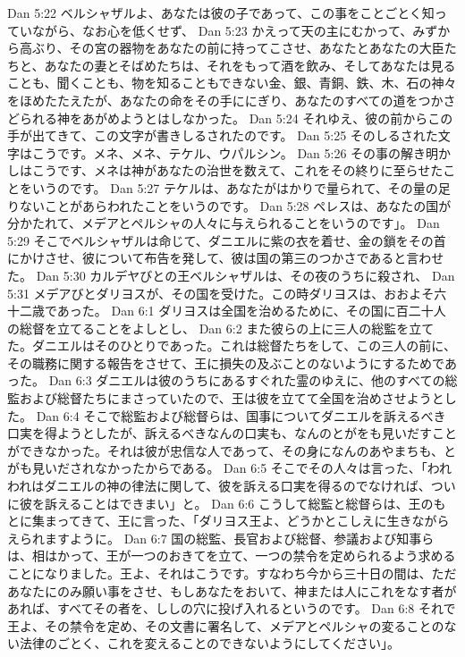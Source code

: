Dan 5:22  ベルシャザルよ、あなたは彼の子であって、この事をことごとく知っていながら、なお心を低くせず、
Dan 5:23  かえって天の主にむかって、みずから高ぶり、その宮の器物をあなたの前に持ってこさせ、あなたとあなたの大臣たちと、あなたの妻とそばめたちは、それをもって酒を飲み、そしてあなたは見ることも、聞くことも、物を知ることもできない金、銀、青銅、鉄、木、石の神々をほめたたえたが、あなたの命をその手ににぎり、あなたのすべての道をつかさどられる神をあがめようとはしなかった。
Dan 5:24  それゆえ、彼の前からこの手が出てきて、この文字が書きしるされたのです。
Dan 5:25  そのしるされた文字はこうです。メネ、メネ、テケル、ウパルシン。
Dan 5:26  その事の解き明かしはこうです、メネは神があなたの治世を数えて、これをその終りに至らせたことをいうのです。
Dan 5:27  テケルは、あなたがはかりで量られて、その量の足りないことがあらわれたことをいうのです。
Dan 5:28  ペレスは、あなたの国が分かたれて、メデアとペルシャの人々に与えられることをいうのです」。
Dan 5:29  そこでベルシャザルは命じて、ダニエルに紫の衣を着せ、金の鎖をその首にかけさせ、彼について布告を発して、彼は国の第三のつかさであると言わせた。
Dan 5:30  カルデヤびとの王ベルシャザルは、その夜のうちに殺され、
Dan 5:31  メデアびとダリヨスが、その国を受けた。この時ダリヨスは、おおよそ六十二歳であった。
Dan 6:1  ダリヨスは全国を治めるために、その国に百二十人の総督を立てることをよしとし、
Dan 6:2  また彼らの上に三人の総監を立てた。ダニエルはそのひとりであった。これは総督たちをして、この三人の前に、その職務に関する報告をさせて、王に損失の及ぶことのないようにするためであった。
Dan 6:3  ダニエルは彼のうちにあるすぐれた霊のゆえに、他のすべての総監および総督たちにまさっていたので、王は彼を立てて全国を治めさせようとした。
Dan 6:4  そこで総監および総督らは、国事についてダニエルを訴えるべき口実を得ようとしたが、訴えるべきなんの口実も、なんのとがをも見いだすことができなかった。それは彼が忠信な人であって、その身になんのあやまちも、とがも見いだされなかったからである。
Dan 6:5  そこでその人々は言った、「われわれはダニエルの神の律法に関して、彼を訴える口実を得るのでなければ、ついに彼を訴えることはできまい」と。
Dan 6:6  こうして総監と総督らは、王のもとに集まってきて、王に言った、「ダリヨス王よ、どうかとこしえに生きながらえられますように。
Dan 6:7  国の総監、長官および総督、参議および知事らは、相はかって、王が一つのおきてを立て、一つの禁令を定められるよう求めることになりました。王よ、それはこうです。すなわち今から三十日の間は、ただあなたにのみ願い事をさせ、もしあなたをおいて、神または人にこれをなす者があれば、すべてその者を、ししの穴に投げ入れるというのです。
Dan 6:8  それで王よ、その禁令を定め、その文書に署名して、メデアとペルシャの変ることのない法律のごとく、これを変えることのできないようにしてください」。
